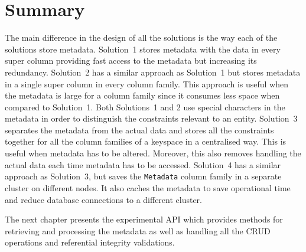 \section{Summary}\label{s:Design-summary}
The main difference in the design of all the  solutions is the way each
of the solutions store metadata.   Solution~1 stores metadata with the data in
every super column providing fast access to the metadata but increasing its
redundancy.  
Solution~2 has a similar approach as Solution~1 but stores metadata in a single
super column in every column family.  This approach is useful when the metadata
is large for a column family since it consumes less space when compared to
Solution~1.
Both Solutions~1 and 2 use special characters in the metadata in order to
distinguish the  constraints relevant to an entity.
Solution~3 separates the metadata from
the actual data and stores all the constraints together for all the column
families of a keyspace  in a centralised way.   This is useful when metadata has
to be  altered.  
Moreover, this  also removes handling the actual data each time metadata
has to be accessed.   
Solution~4 has a similar approach as Solution~3, but saves the \texttt{Metadata}
column family in a separate cluster on different nodes.   It also caches the
metadata  to save operational time and reduce database connections to a
different cluster.

The next chapter presents the  experimental \ac{API} which provides methods for
 retrieving and processing the metadata as well as handling all the \ac{CRUD}
 operations and referential integrity validations. 





